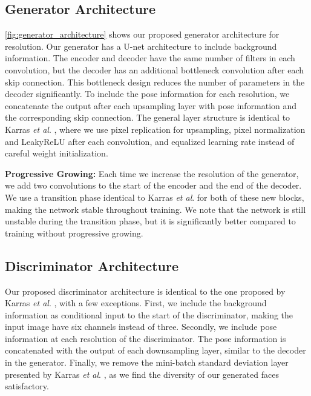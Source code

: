 \documentclass[runningheads]{llncs}
\newcommand{\etal}{\textit{et al}. }
\begin{document}
\subsection{Generator Architecture}

\autoref{fig:generator_architecture} shows our proposed generator architecture for  resolution. Our generator has a U-net \cite{ronneberger2015u} architecture to include background information.
The encoder and decoder have the same number of filters in each convolution, but the decoder has an additional  bottleneck convolution after each skip connection. This bottleneck design reduces the number of parameters in the decoder significantly. To include the pose information for each resolution, we concatenate the output after each upsampling layer with pose information and the corresponding skip connection. The general layer structure is identical to Karras \etal \cite{Karras2017}, where we use pixel replication for upsampling, pixel normalization and LeakyReLU after each convolution, and equalized learning rate instead of careful weight initialization. 

\textbf{Progressive Growing:} Each time we increase the resolution of the generator, we add two  convolutions to the start of the encoder and the end of the decoder. We use a transition phase identical to Karras \etal \cite{Karras2017} for both of these new blocks, making the network stable throughout training. We note that the network is still unstable during the transition phase, but it is significantly better compared to training without progressive growing. 



\subsection{Discriminator Architecture}

Our proposed discriminator architecture is identical to the one proposed by Karras \etal \cite{Karras2017}, with a few exceptions. First, we include the background information as conditional input to the start of the discriminator, making the input image have six channels instead of three. Secondly, we include pose information at each resolution of the discriminator. The pose information is concatenated with the output of each downsampling layer, similar to the decoder in the generator. Finally, we remove the mini-batch standard deviation layer presented by Karras \etal \cite{Karras2017}, as we find the diversity of our generated faces satisfactory.
\end{document}
